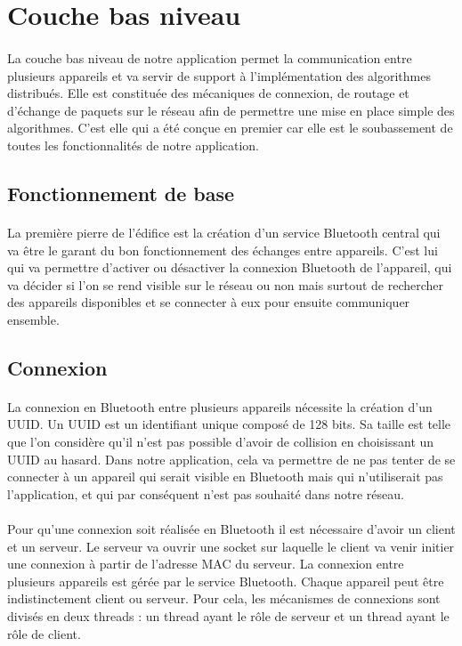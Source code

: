 \documentclass[a4paper,10pt]{report}
\begin{document}
  \section{Couche bas niveau}
    \paragraph{}
    La couche bas niveau de notre application permet la communication entre plusieurs appareils et va servir de support à l'implémentation des algorithmes distribués. Elle est constituée des mécaniques de connexion, de routage et d'échange de paquets sur le réseau afin de permettre une mise en place simple des algorithmes. C'est elle qui a été conçue en premier car elle est le soubassement de toutes les fonctionnalités de notre application.
  
    \subsection{Fonctionnement de base}
    \paragraph{}
    La première pierre de l'édifice est la création d'un service Bluetooth central qui va être le garant du bon fonctionnement des échanges entre appareils. C'est lui qui va permettre d'activer ou désactiver la connexion Bluetooth de l'appareil, qui va décider si l'on se rend visible sur le réseau ou non mais surtout de rechercher des appareils disponibles et se connecter à eux pour ensuite communiquer ensemble.
    
    \subsection{Connexion}
    \paragraph{}
    La connexion en Bluetooth entre plusieurs appareils nécessite la création d'un UUID. Un UUID est un identifiant unique composé de 128 bits. Sa taille est telle que l'on considère qu'il n'est pas possible d'avoir de collision en choisissant un UUID au hasard. Dans notre application, cela va permettre de ne pas tenter de se connecter à un appareil qui serait visible en Bluetooth mais qui n'utiliserait pas l'application, et qui par conséquent n'est pas souhaité dans notre réseau.
    \paragraph{}
    Pour qu'une connexion soit réalisée en Bluetooth il est nécessaire d'avoir un client et un serveur. Le serveur va ouvrir une socket sur laquelle le client va venir initier une connexion à partir de l'adresse MAC du serveur.
    La connexion entre plusieurs appareils est gérée par le service Bluetooth. Chaque appareil peut être indistinctement client ou serveur. Pour cela, les mécanismes de connexions sont divisés en deux threads : un thread ayant le rôle de serveur et un thread ayant le rôle de client.
\end{document}
